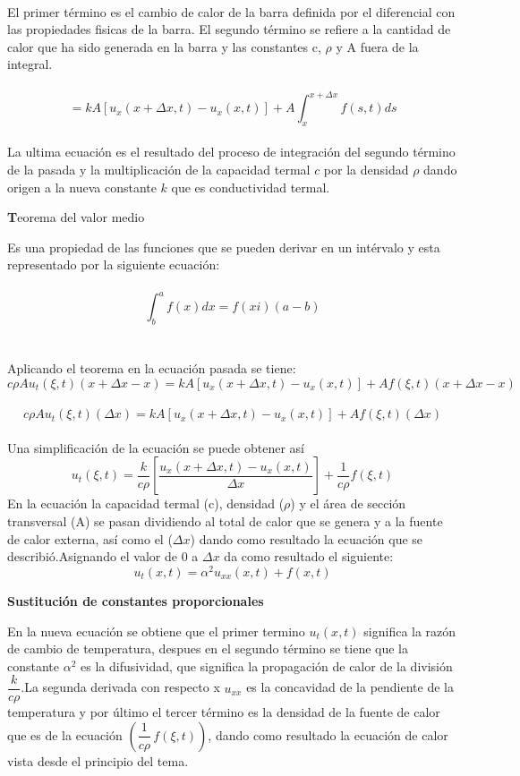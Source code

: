 \documentclass[10pt,a4paper]{report}
\begin{document}
\\El primer término es el cambio de calor de la barra definida por el diferencial con las propiedades fisicas de la barra. El segundo término se refiere a la cantidad de calor que ha sido generada en la barra y las constantes c, $\rho$ y A fuera de la integral.
\\\\ $$= k A[u_x(x+\Delta x,t)-u_x(x,t)]+A \int_x^{x+\Delta x}f(s,t)ds$$
\\ La ultima ecuación es el resultado del proceso de integración del segundo término de la pasada y la multiplicación de la capacidad termal $c$ por la densidad $\rho$ dando origen a la nueva constante $k$ que es conductividad termal.
\begin{center}
\textbf Teorema del valor medio
\end{center}
Es una propiedad de las funciones que se pueden derivar en un intérvalo y esta representado por la siguiente ecuación:
\\\\ $$\displaystyle \int_b^a f(x)dx = f(xi)(a-b)$$
\\\\ Aplicando el teorema en la ecuación pasada se tiene:
\\$$\displaystyle c \rho A u_t (\xi , t) (x + \Delta x - x) = k A [u_x(x + \Delta x, t) - u_x (x , t)]+ A f(\xi ,t)(x + \Delta x - x)$$
\\$$\displaystyle c \rho A u_t (\xi , t) (\Delta x) = k A [u_x(x + \Delta x, t) - u_x (x , t)]+ A f(\xi ,t)(\Delta x)$$
\\ Una simplificación de la ecuación se puede obtener así
\\ $$\displaystyle u_t(\xi , t)= \frac{k}{c \rho}\left[ \dfrac{u_x(x + \Delta x,t)-u_x(x,t)}{\Delta x} \right]+ \dfrac{1}{c \rho} f(\xi , t)$$
\newpage
En la ecuación la capacidad termal (c), densidad ($\rho$) y el área de sección transversal (A) se pasan dividiendo al total de calor que se genera y a la fuente de calor externa, así como el ($\Delta x$) dando como resultado la ecuación que se describió.Asignando el valor de $0$ a $\Delta x$ da como resultado el siguiente:
$$\displaystyle u_t(x,t)=\alpha^2 u_{xx}(x,t)+f(x,t)$$
\begin{center}
\textbf{Sustitución de constantes proporcionales}
\end{center}
En la nueva ecuación se obtiene que el primer termino $u_t(x,t)$ significa la razón de cambio de temperatura, despues en el segundo término se tiene que la constante $\alpha^2$ es la difusividad, que significa la propagación de calor de la división $\dfrac{k}{c \rho}$.La segunda derivada con respecto x $u_{xx}$ es la concavidad de la pendiente de la temperatura y por último el tercer término es la densidad de la fuente de calor que es de la ecuación $\displaystyle \left(\dfrac{1}{c \rho} \,f(\xi ,t)\right)$, dando como resultado la ecuación de calor vista desde el principio del tema. 
\end{document}
